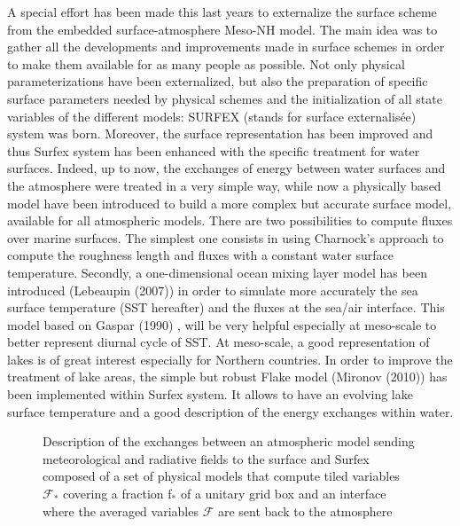 A special effort has been made this last years to externalize the surface scheme from the embedded surface-atmosphere Meso-NH model. The main idea was to gather all the developments and improvements made in surface schemes in order to make them available for as many people as possible. Not only physical parameterizations have been externalized, but also the preparation of specific surface parameters needed by physical schemes and the initialization of all state variables of the different models: SURFEX (stands for surface externalis\'{e}e) system was born. 
Moreover, the surface representation has been improved and thus Surfex system has been enhanced with the specific treatment for water surfaces. Indeed, up to now, the exchanges of energy between water surfaces and the atmosphere were treated in a very simple way, while now a physically based model have been introduced to build a more complex but accurate surface model, available for all atmospheric models. There are two possibilities to compute fluxes over marine surfaces. The simplest one consists in using Charnock's approach to compute the roughness length and fluxes with a constant water surface temperature. Secondly, a one-dimensional ocean mixing layer model has been introduced (Lebeaupin (2007)\nocite{lebeaupin2007})
 in order to simulate more accurately the sea surface temperature (SST hereafter) and the fluxes at the sea/air interface. This model based on Gaspar (1990)\nocite{Gaspar1990}
, will be very helpful especially at meso-scale to better represent diurnal cycle of SST. 
At meso-scale, a good representation of lakes is of great interest especially for Northern countries. In order to  improve the treatment of lake areas, the simple but robust Flake model (Mironov (2010)\nocite{mironov2010}) has been implemented within Surfex system. It allows to have an evolving lake surface temperature and a good description of the energy exchanges within water.

\begin{figure}[h]
\hspace*{2.cm}
\caption{ Description of the exchanges between an atmospheric model sending meteorological and radiative fields to the surface and Surfex composed of a set of physical models that compute tiled variables $\mathcal{F}_{*}$ covering a fraction f$_{*}$ of a unitary grid box and an interface where the averaged variables $\mathcal{F}$ are sent back to the atmosphere \label{surf1}}
\end{figure}

